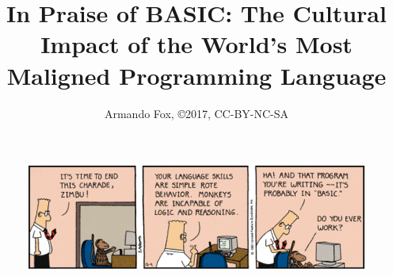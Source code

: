 \documentclass[11pt,twoside,twocolumn,times]{article}
\title{In Praise of BASIC: The Cultural Impact of the World's Most
  Maligned Programming Language}
\author{Armando Fox, \copyright 2017, CC-BY-NC-SA}
\date{}
\begin{document}

\maketitle

\begin{figure}[h!]
\noindent\includegraphics[width=\textwidth]{figs/dilbert-1991-12-04.png}
\end{figure}














\end{document}
